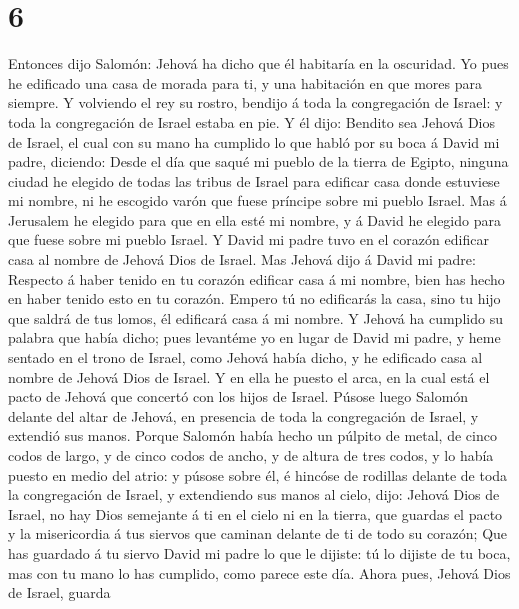 \hypertarget{section-5}{%
\section{6}\label{section-5}}

 Entonces dijo Salomón: Jehová ha dicho que él habitaría en
la oscuridad.  Yo pues he edificado una casa de morada para
ti, y una habitación en que mores para siempre.  Y volviendo
el rey su rostro, bendijo á toda la congregación de Israel: y toda la
congregación de Israel estaba en pie.  Y él dijo: Bendito
sea Jehová Dios de Israel, el cual con su mano ha cumplido lo que habló
por su boca á David mi padre, diciendo:  Desde el día que
saqué mi pueblo de la tierra de Egipto, ninguna ciudad he elegido de
todas las tribus de Israel para edificar casa donde estuviese mi nombre,
ni he escogido varón que fuese príncipe sobre mi pueblo Israel.
 Mas á Jerusalem he elegido para que en ella esté mi nombre,
y á David he elegido para que fuese sobre mi pueblo Israel. 
Y David mi padre tuvo en el corazón edificar casa al nombre de Jehová
Dios de Israel.  Mas Jehová dijo á David mi padre: Respecto
á haber tenido en tu corazón edificar casa á mi nombre, bien has hecho
en haber tenido esto en tu corazón.  Empero tú no edificarás
la casa, sino tu hijo que saldrá de tus lomos, él edificará casa á mi
nombre.  Y Jehová ha cumplido su palabra que había dicho;
pues levantéme yo en lugar de David mi padre, y heme sentado en el trono
de Israel, como Jehová había dicho, y he edificado casa al nombre de
Jehová Dios de Israel.  Y en ella he puesto el arca, en la
cual está el pacto de Jehová que concertó con los hijos de Israel.
 Púsose luego Salomón delante del altar de Jehová, en
presencia de toda la congregación de Israel, y extendió sus manos.
 Porque Salomón había hecho un púlpito de metal, de cinco
codos de largo, y de cinco codos de ancho, y de altura de tres codos, y
lo había puesto en medio del atrio: y púsose sobre él, é hincóse de
rodillas delante de toda la congregación de Israel, y extendiendo sus
manos al cielo, dijo:  Jehová Dios de Israel, no hay Dios
semejante á ti en el cielo ni en la tierra, que guardas el pacto y la
misericordia á tus siervos que caminan delante de ti de todo su corazón;
 Que has guardado á tu siervo David mi padre lo que le
dijiste: tú lo dijiste de tu boca, mas con tu mano lo has cumplido, como
parece este día.  Ahora pues, Jehová Dios de Israel, guarda
